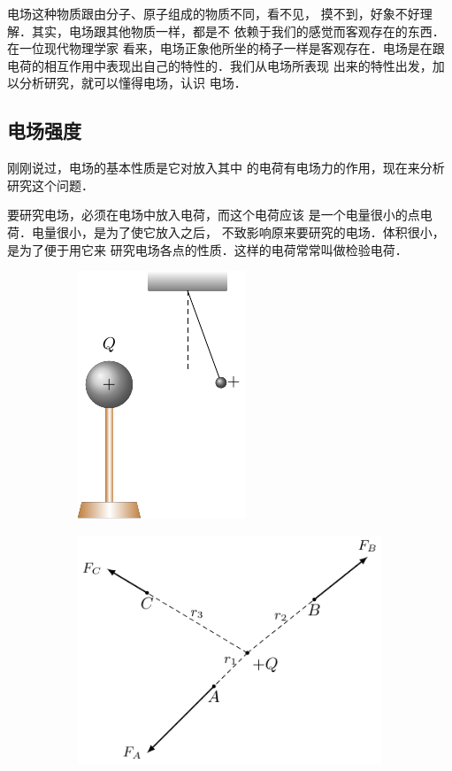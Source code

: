 电场这种物质跟由分子、原子组成的物质不同，看不见，
摸不到，好象不好理解．其实，电场跟其他物质一样，都是不
依赖于我们的感觉而客观存在的东西．在一位现代物理学家
看来，电场正象他所坐的椅子一样是客观存在．电场是在跟
电荷的相互作用中表现出自己的特性的．我们从电场所表现
出来的特性出发，加以分析研究，就可以懂得电场，认识
电场．

\subsection{电场强度} 

刚刚说过，电场的基本性质是它对放入其中
的电荷有电场力的作用，现在来分析研究这个问题．

要研究电场，必须在电场中放入电荷，而这个电荷应该
是一个电量很小的点电荷．电量很小，是为了使它放入之后，
不致影响原来要研究的电场．体积很小，是为了便于用它来
研究电场各点的性质．这样的电荷常常叫做检验电荷．
\begin{figure}[htbp]
    \centering
    \begin{subfigure}{0.4\linewidth}
        \centering
        \includegraphics{fig/B/6-4a.pdf}
        \caption{}\label{fig_B_6-4a}
    \end{subfigure}
    \hfil
    \begin{subfigure}{0.4\linewidth}
        \centering
        \includegraphics{fig/B/6-4b.pdf}
        \caption{}\label{fig_B_6-4b}
    \end{subfigure}
    \caption{}\label{fig_B_6-4}
\end{figure}

